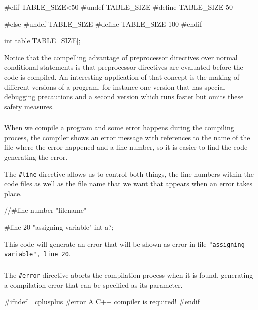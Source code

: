 \documentclass[10pt,a4paper]{scrartcl}
\begin{document}
\begin{multicols*}{2}
\begin{TPCpp}
#elif TABLE_SIZE<50
#undef TABLE_SIZE
#define TABLE_SIZE 50

#else
#undef TABLE_SIZE
#define TABLE_SIZE 100
#endif

int table[TABLE_SIZE];
\end{TPCpp}

Notice that the compelling advantage of preprocessor directives over normal conditional statements is that preprocessor directives are evaluated before the code is compiled. An interesting application of that concept is the making of different versions of a program, for instance one version that has special debugging precautions and a second version which runs faster but omits these safety measures.

\subsubsection{}
\label{sec:LineControl}

 When we compile a program and some error happens during the compiling process, the compiler shows an error message with references to the name of the file where the error happened and a line number, so it is easier to find the code generating the error.

The \verb+#line+ directive allows us to control both things, the line numbers within the code files as well as the file name that we want that appears when an error takes place.

\begin{TPCpp}
//#line number "filename"

#line 20 "assigning variable"
int a?;
\end{TPCpp}

This code will generate an error that will be shown as error in file \verb+"assigning variable", line 20+.

\subsubsection{}
\label{sec:ErrorDirective}

The \verb+#error+ directive aborts the compilation process when it is found, generating a compilation error that can be specified as its parameter.

\begin{TPCpp}
#ifndef _cplusplus
#error A C++ compiler is required!
#endif
\end{TPCpp}

\subsubsection{}
\label{sec:SourceFileInclusion}


\end{multicols*}
\end{document}

